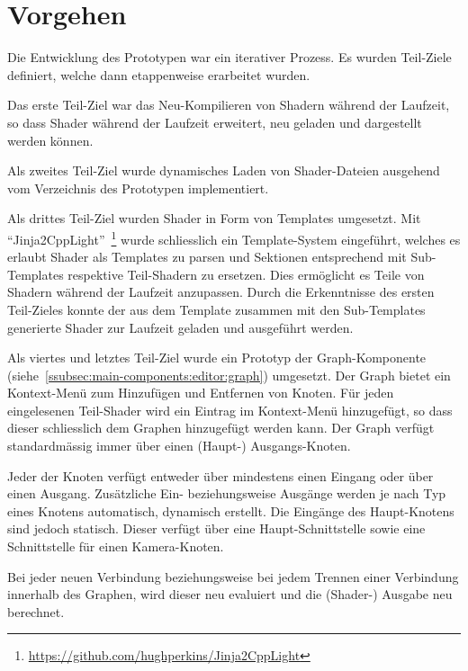 
\section{Vorgehen}
\label{sec:prototype:procedure}

Die Entwicklung des Prototypen war ein iterativer Prozess. Es wurden Teil-Ziele
definiert, welche dann etappenweise erarbeitet wurden.

Das erste Teil-Ziel war das Neu-Kompilieren von Shadern während der Laufzeit,
so dass Shader während der Laufzeit erweitert, neu geladen und dargestellt
werden können.

Als zweites Teil-Ziel wurde dynamisches Laden von Shader-Dateien ausgehend vom
Verzeichnis des Prototypen implementiert.

Als drittes Teil-Ziel wurden Shader in Form von Templates umgesetzt. Mit
``Jinja2CppLight''~\footnote{\href{https://github.com/hughperkins/Jinja2CppLight}{https://github.com/hughperkins/Jinja2CppLight}}
wurde schliesslich ein Template-System eingeführt, welches es erlaubt Shader
als Templates zu parsen und Sektionen entsprechend mit Sub-Templates respektive
Teil-Shadern zu ersetzen.  Dies ermöglicht es Teile von Shadern während der
Laufzeit anzupassen. Durch die Erkenntnisse des ersten Teil-Zieles konnte der
aus dem Template zusammen mit den Sub-Templates generierte Shader zur Laufzeit
geladen und ausgeführt werden.

Als viertes und letztes Teil-Ziel wurde ein Prototyp der Graph-Komponente
(siehe~\autoref{ssubsec:main-components:editor:graph}) umgesetzt. Der Graph bietet
ein Kontext-Menü zum Hinzufügen und Entfernen von Knoten. Für jeden
eingelesenen Teil-Shader wird ein Eintrag im Kontext-Menü hinzugefügt, so dass
dieser schliesslich dem Graphen hinzugefügt werden kann. Der Graph verfügt
standardmässig immer über einen (Haupt-) Ausgangs-Knoten.

Jeder der Knoten verfügt entweder über mindestens einen Eingang oder über einen
Ausgang.  Zusätzliche Ein- beziehungsweise Ausgänge werden je nach Typ eines
Knotens automatisch, dynamisch erstellt. Die Eingänge des Haupt-Knotens sind
jedoch statisch. Dieser verfügt über eine Haupt-Schnittstelle sowie eine
Schnittstelle für einen Kamera-Knoten.

Bei jeder neuen Verbindung beziehungsweise bei jedem Trennen einer Verbindung
innerhalb des Graphen, wird dieser neu evaluiert und die (Shader-) Ausgabe neu
berechnet.

